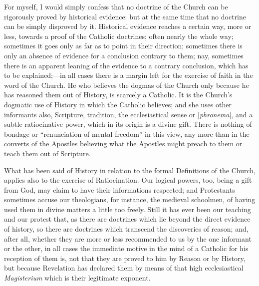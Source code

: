For myself, I would simply confess that no doctrine of the Church can
be rigorously proved by historical evidence: but at the same time that
no doctrine can be simply disproved by it. Historical evidence reaches a
certain way, more or less, towards a proof of the Catholic doctrines;
often nearly the whole way; sometimes it goes only as far as to point in
their direction; sometimes there is only an absence of evidence for a
conclusion contrary to them; nay, sometimes there is an apparent leaning
of the evidence to a contrary conclusion, which has to be explained;—in
all cases there is a margin left for the exercise of faith in the word
of the Church. He who believes the dogmas of the Church only because he
has reasoned them out of History, is scarcely a Catholic. It is the
Church's dogmatic use of History in which the Catholic believes; and she
uses other informants also, Scripture, tradition, the
ecclesiastical sense or [\emph{phron\={e}ma}],
and a subtle ratiocinative power, which in its origin is a divine gift.
There is nothing of bondage or ``renunciation of mental
freedom'' in this view, any more than in the converts of the
Apostles believing what the Apostles might preach to them or teach them
out of Scripture.

What has been said of History in relation to the formal Definitions
of the Church, applies also to the exercise of Ratiocination. Our
logical powers, too, being a gift from God, may claim to have their
informations respected; and Protestants sometimes accuse our
theologians, for instance, the medieval schoolmen, of having used them
in divine matters a little too freely. Still it has ever been our
teaching and our protest that, as there are doctrines which lie beyond
the direct evidence of history, so there are doctrines which transcend
the discoveries of reason; and, after all, whether they are more or less
recommended to us by the one informant or the other, in all cases the
immediate motive in the mind of a Catholic for his reception of them is,
not that they are proved to him by Reason or by History, but because
Revelation has declared them by means of that high ecclesiastical \emph{Magisterium}
which is their legitimate exponent.

